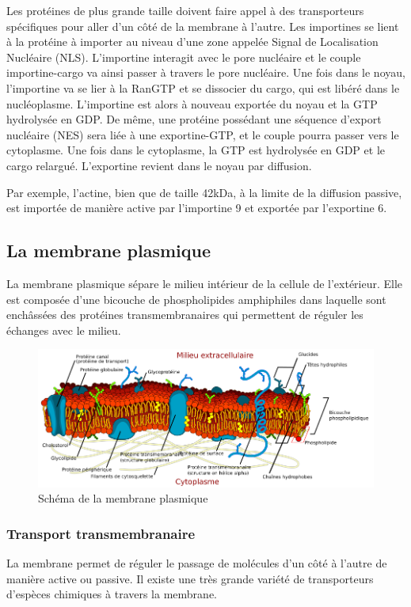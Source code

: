 Les protéines de plus grande taille doivent faire appel à des transporteurs spécifiques pour aller d'un côté de la membrane à l'autre. 
Les importines se lient à la protéine à importer au niveau d'une zone appelée \og Signal de Localisation Nucléaire \fg (NLS). L’importine interagit avec le pore nucléaire et le couple importine-cargo va ainsi passer à travers le pore nucléaire. 
Une fois dans le noyau, l'importine va se lier à la RanGTP et se dissocier du cargo, qui est libéré dans le nucléoplasme. L'importine est alors à nouveau exportée du noyau et la GTP hydrolysée en GDP. 
De même, une protéine possédant une séquence d'export nucléaire (NES) sera liée à une exportine-GTP, et le couple pourra passer vers le cytoplasme. Une fois dans le cytoplasme, la GTP est hydrolysée en GDP et le cargo relargué. L'exportine revient dans le noyau par diffusion. 

Par exemple, l'actine, bien que de taille 42kDa, à la limite de la diffusion passive, est importée de manière active par l'importine 9 et exportée par l'exportine 6. 

\subsection{La membrane plasmique}

La membrane plasmique sépare le milieu intérieur de la cellule de l'extérieur. Elle est composée d'une bicouche de phospholipides amphiphiles dans laquelle sont enchâssées des protéines transmembranaires qui permettent de réguler les échanges avec le milieu. 

\begin{figure}
\includegraphics[scale=0.5]{Cell_membrane_detailed_diagram_fr.png}
\caption{Schéma de la membrane plasmique}
\end{figure}
\subsubsection{Transport transmembranaire}
La membrane permet de réguler le passage de molécules d'un côté à l'autre de manière active ou passive. 
 Il existe une très grande variété de transporteurs d'espèces chimiques à travers la membrane. 

